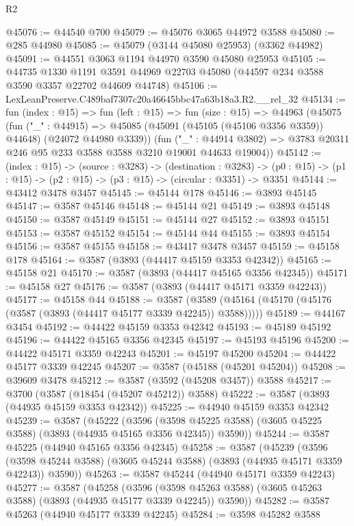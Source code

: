 \begin{lexlean}{R2}
\begin{coremodule}
@45076 := @44540 @700
@45079 := @45076 @3065 @44972 @3588
@45080 := @285 @44980
@45085 := @45079 (@3144 @45080 @25953) (@3362 @44982)
@45091 := @44551 @3063 @1194 @44970 @3590 @45080 @25953
@45105 := @44735
    @1330
    @1191
    @3591
    @44969
    @22703
    @45080
    (@44597 @234 @3588 @3590 @3357 @22702 @44609 @44748)
@45106 := LexLeanPreserve.C489baf7307c20a46645bbc47a63b18a3.R2.__rel_32
@45134 := fun (index : @15) =>
  fun (left : @15) =>
  fun (size : @15) =>
  @44963
    (@45075
      (fun ("_" : @44915) =>
      @45085 (@45091 (@45105 (@45106 @3356 @3359)) @44648) (@24072 @44980 @3339))
      (fun ("_" : @44914 @3802) =>
      @3783 @20311 @246 @95 @233 @3588 @3588 @3210 @19001 @44633 @19004))
@45142 := (index : @15) ->
  (source : @3283) ->
  (destination : @3283) ->
  (p0 : @15) -> (p1 : @15) -> (p2 : @15) -> (p3 : @15) -> (circular : @3351) -> @3351
@45144 := @43412 @3478 @3457
@45145 := @45144 @178
@45146 := @3893 @45145
@45147 := @3587 @45146
@45148 := @45144 @21
@45149 := @3893 @45148
@45150 := @3587 @45149
@45151 := @45144 @27
@45152 := @3893 @45151
@45153 := @3587 @45152
@45154 := @45144 @44
@45155 := @3893 @45154
@45156 := @3587 @45155
@45158 := @43417 @3478 @3457
@45159 := @45158 @178
@45164 := @3587 (@3893 (@44417 @45159 @3353 @42342))
@45165 := @45158 @21
@45170 := @3587 (@3893 (@44417 @45165 @3356 @42345))
@45171 := @45158 @27
@45176 := @3587 (@3893 (@44417 @45171 @3359 @42243))
@45177 := @45158 @44
@45188 := @3587
    (@3589 (@45164 (@45170 (@45176 (@3587 (@3893 (@44417 @45177 @3339 @42245)) @3588)))))
@45189 := @44167 @3454
@45192 := @44422 @45159 @3353 @42342
@45193 := @45189 @45192
@45196 := @44422 @45165 @3356 @42345
@45197 := @45193 @45196
@45200 := @44422 @45171 @3359 @42243
@45201 := @45197 @45200
@45204 := @44422 @45177 @3339 @42245
@45207 := @3587 (@45188 (@45201 @45204))
@45208 := @39609 @3478
@45212 := @3587 (@3592 (@45208 @3457)) @3588
@45217 := @3700 (@3587 (@18454 (@45207 @45212)) @3588)
@45222 := @3587 (@3893 (@44935 @45159 @3353 @42342))
@45225 := @44940 @45159 @3353 @42342
@45239 := @3587
    (@45222
      (@3596 (@3598 @45225 @3588) (@3605 @45225 @3588) (@3893 (@44935 @45165 @3356 @42345)) @3590))
@45244 := @3587 @45225 (@44940 @45165 @3356 @42345)
@45258 := @3587
    (@45239
      (@3596 (@3598 @45244 @3588) (@3605 @45244 @3588) (@3893 (@44935 @45171 @3359 @42243)) @3590))
@45263 := @3587 @45244 (@44940 @45171 @3359 @42243)
@45277 := @3587
    (@45258
      (@3596 (@3598 @45263 @3588) (@3605 @45263 @3588) (@3893 (@44935 @45177 @3339 @42245)) @3590))
@45282 := @3587 @45263 (@44940 @45177 @3339 @42245)
@45284 := @3598 @45282 @3588

\end{coremodule}
\end{lexlean}
